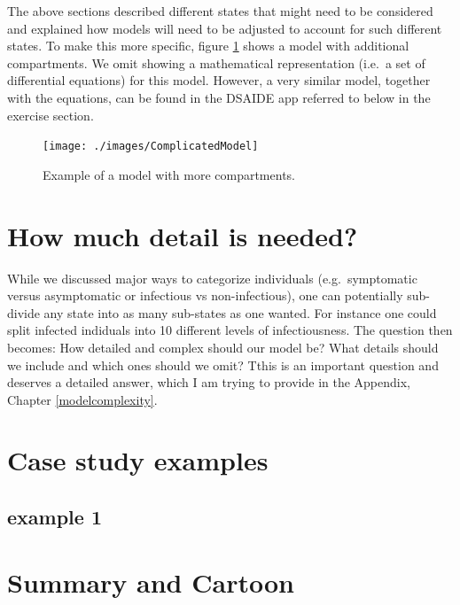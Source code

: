 \documentclass[
]{book}
\begin{document}
The above sections described different states that might need to be considered and explained how models will need to be adjusted to account for such different states. To make this more specific, figure \ref{fig:complicatedmodel} shows a model with additional compartments. We omit showing a mathematical representation (i.e.~a set of differential equations) for this model. However, a very similar model, together with the equations, can be found in the DSAIDE app referred to below in the exercise section.

\begin{figure}
\texttt{[image: ./images/ComplicatedModel]} \caption{Example of a model with more compartments.}\label{fig:complicatedmodel}
\end{figure}

\hypertarget{how-much-detail-is-needed}{%
\section{How much detail is needed?}\label{how-much-detail-is-needed}}

While we discussed major ways to categorize individuals (e.g.~symptomatic versus asymptomatic or infectious vs non-infectious), one can potentially sub-divide any state into as many sub-states as one wanted. For instance one could split infected indiduals into 10 different levels of infectiousness. The question then becomes: How detailed and complex should our model be? What details should we include and which ones should we omit? Tthis is an important question and deserves a detailed answer, which I am trying to provide in the Appendix, Chapter \ref{modelcomplexity}.

\hypertarget{case-study-examples}{%
\section{Case study examples}\label{case-study-examples}}

\hypertarget{example-1}{%
\subsection{example 1}\label{example-1}}

\hypertarget{summary-and-cartoon-1}{%
\section{Summary and Cartoon}\label{summary-and-cartoon-1}}
\end{document}
